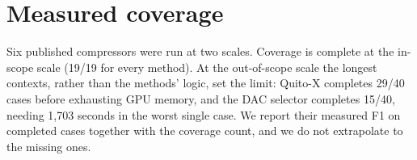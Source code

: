 \documentclass[conference]{IEEEtran}
\begin{document}
\section{Measured coverage}
\label{app:coverage}

Six published compressors were run at two scales. Coverage is complete at the in-scope scale
(19/19 for every method). At the out-of-scope scale the longest contexts, rather than the
methods' logic, set the limit: Quito-X completes 29/40 cases before exhausting GPU memory, and
the DAC selector completes 15/40, needing 1{,}703 seconds in the worst single case. We report
their measured F1 on completed cases together with the coverage count, and we do not
extrapolate to the missing ones.
\end{document}
